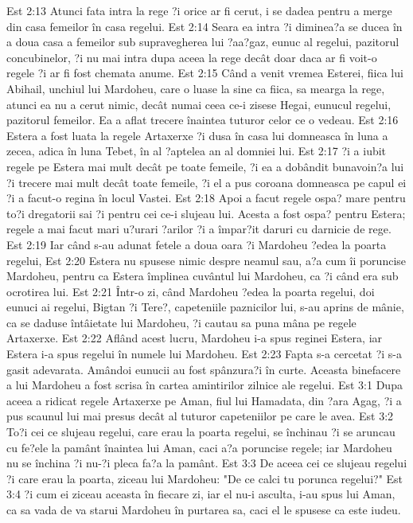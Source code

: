 Est 2:13  Atunci fata intra la rege ?i orice ar fi cerut, i se dadea pentru a merge din casa femeilor în casa regelui.
Est 2:14  Seara ea intra ?i diminea?a se ducea în a doua casa a femeilor sub supravegherea lui ?aa?gaz, eunuc al regelui, pazitorul concubinelor, ?i nu mai intra dupa aceea la rege decât doar daca ar fi voit-o regele ?i ar fi fost chemata anume.
Est 2:15  Când a venit vremea Esterei, fiica lui Abihail, unchiul lui Mardoheu, care o luase la sine ca fiica, sa mearga la rege, atunci ea nu a cerut nimic, decât numai ceea ce-i zisese Hegai, eunucul regelui, pazitorul femeilor. Ea a aflat trecere înaintea tuturor celor ce o vedeau.
Est 2:16  Estera a fost luata la regele Artaxerxe ?i dusa în casa lui domneasca în luna a zecea, adica în luna Tebet, în al ?aptelea an al domniei lui.
Est 2:17  ?i a iubit regele pe Estera mai mult decât pe toate femeile, ?i ea a dobândit bunavoin?a lui ?i trecere mai mult decât toate femeile, ?i el a pus coroana domneasca pe capul ei ?i a facut-o regina în locul Vastei.
Est 2:18  Apoi a facut regele ospa? mare pentru to?i dregatorii sai ?i pentru cei ce-i slujeau lui. Acesta a fost ospa? pentru Estera; regele a mai facut mari u?urari ?arilor ?i a împar?it daruri cu darnicie de rege.
Est 2:19  Iar când s-au adunat fetele a doua oara ?i Mardoheu ?edea la poarta regelui,
Est 2:20  Estera nu spusese nimic despre neamul sau, a?a cum îi poruncise Mardoheu, pentru ca Estera împlinea cuvântul lui Mardoheu, ca ?i când era sub ocrotirea lui.
Est 2:21  Într-o zi, când Mardoheu ?edea la poarta regelui, doi eunuci ai regelui, Bigtan ?i Tere?, capeteniile paznicilor lui, s-au aprins de mânie, ca se daduse întâietate lui Mardoheu, ?i cautau sa puna mâna pe regele Artaxerxe.
Est 2:22  Aflând acest lucru, Mardoheu i-a spus reginei Estera, iar Estera i-a spus regelui în numele lui Mardoheu.
Est 2:23  Fapta s-a cercetat ?i s-a gasit adevarata. Amândoi eunucii au fost spânzura?i în curte. Aceasta binefacere a lui Mardoheu a fost scrisa în cartea amintirilor zilnice ale regelui.
Est 3:1  Dupa aceea a ridicat regele Artaxerxe pe Aman, fiul lui Hamadata, din ?ara Agag, ?i a pus scaunul lui mai presus decât al tuturor capeteniilor pe care le avea.
Est 3:2  To?i cei ce slujeau regelui, care erau la poarta regelui, se închinau ?i se aruncau cu fe?ele la pamânt înaintea lui Aman, caci a?a poruncise regele; iar Mardoheu nu se închina ?i nu-?i pleca fa?a la pamânt.
Est 3:3  De aceea cei ce slujeau regelui ?i care erau la poarta, ziceau lui Mardoheu: "De ce calci tu porunca regelui?"
Est 3:4  ?i cum ei ziceau aceasta în fiecare zi, iar el nu-i asculta, i-au spus lui Aman, ca sa vada de va starui Mardoheu în purtarea sa, caci el le spusese ca este iudeu.
